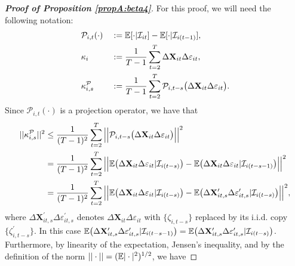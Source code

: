 \documentclass[a4paper,12pt]{article}
\begin{document}
\begin{proof}[\textnormal{\textbf{Proof of Proposition \ref{propA:beta4}}}]
For this proof, we will need the following notation:
\begin{alignat*}{2}
&\mathcal{P}_{i,t}(\cdot) &&:= \mathbb{E}[\cdot|\mathcal{I}_{it}] -\mathbb{E}[\cdot|\mathcal{I}_{i(t-1)}], \\
&\kappa_{i} && := \frac{1}{T-1}\sum_{t=2}^T  \Delta \mathbf{X}_{it}\Delta \varepsilon_{it}, \\
&\kappa_{i, s}^{\mathcal{P}} && := \frac{1}{T-1}\sum_{t=2}^T \mathcal{P}_{i, t-s}\big( \Delta \mathbf{X}_{it}\Delta \varepsilon_{it}\big).
\end{alignat*}
Since $\mathcal{P}_{i, t}(\cdot)$ is a projection operator, we have that 
\begin{align*}
||\kappa_{i, s}^{\mathcal{P}}||^2 %
&\leq \frac{1}{(T-1)^2} \sum_{t=2}^T \Big|\Big| \mathcal{P}_{i, t-s}\big( \Delta \mathbf{X}_{it}\Delta \varepsilon_{it}\big) \Big|\Big|^2\\
&= \frac{1}{(T-1)^2} \sum_{t=2}^T \Big|\Big| \ex \big(\Delta \mathbf{X}_{it}\Delta \varepsilon_{it}|\mathcal{I}_{i(t-s)}\big) -\ex \big(\Delta \mathbf{X}_{it}\Delta \varepsilon_{it}|\mathcal{I}_{i(t-s-1)}\big) \Big|\Big|^2\\
&= \frac{1}{(T-1)^2} \sum_{t=2}^T \Big|\Big| \ex \big(\Delta \mathbf{X}_{it}\Delta \varepsilon_{it}|\mathcal{I}_{i(t-s)}\big) -\ex \big(\Delta \mathbf{X}_{it, s}^\prime\Delta \varepsilon_{it, s}^\prime|\mathcal{I}_{i(t-s)}\big) \Big|\Big|^2,
\end{align*}
where $\Delta \mathbf{X}_{it, s}^\prime\Delta \varepsilon_{it, s}^\prime$ denotes $\Delta \mathbf{X}_{it}\Delta \varepsilon_{it}$ with $\{\zeta_{i, t-s}\}$ replaced by its i.i.d. copy $\{\zeta_{i, t-s}^\prime\}$. In this case $\mathbb{E} \big(\Delta \mathbf{X}_{it, s}^\prime\Delta \varepsilon_{it, s}^\prime|\mathcal{I}_{i(t-s -1)}\big) = \mathbb{E} \big(\Delta \mathbf{X}_{it, s}^\prime\Delta \varepsilon_{it, s}^\prime|\mathcal{I}_{i(t-s)}\big)$. Furthermore, by linearity of the expectation, Jensen's inequality, {\color{black} and by the definition of the norm \linebreak $||\cdot|| = (\mathbb{E}|\cdot|^2)^{1/2}$}, we have 

\end{proof}
\end{document}
